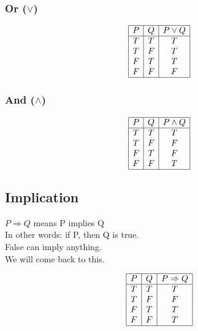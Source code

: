 \documentclass[11pt]{scrartcl}
\begin{document}
\subsubsection{Or ($\lor$)}
\begin{center}
	\begin{displaymath}
		\begin{array}{|c|c|c|}
			\hline
			P & Q & P \lor Q \\ 
			\hline
			T & T & T\\
			T & F & T\\
			F & T & T\\
			F & F & F\\ 
			\hline
		\end{array}
	\end{displaymath}
\end{center}

\subsubsection{And ($\land$)}
\begin{center}
	\begin{displaymath}
		\begin{array}{|c|c|c|}
			\hline
			P & Q & P \land Q \\ 
			\hline
			T & T & T\\
			T & F & F\\
			F & T & F\\
			F & F & T\\ 
			\hline
		\end{array}
	\end{displaymath}
\end{center}

\subsection{Implication}
$P \Rightarrow Q$ means P implies Q 
\\
In other words: if P, then Q is true.
\\
False can imply anything.
\\
We will come back to this.
\begin{center}
	\begin{displaymath}
		\begin{array}{|c|c|c|}
			\hline
			P & Q & P \Rightarrow Q \\ 
			\hline
			T & T & T\\
			T & F & F\\
			F & T & T\\
			F & F & T\\
			\hline
		\end{array}
	\end{displaymath}
\end{center}
\end{document}
